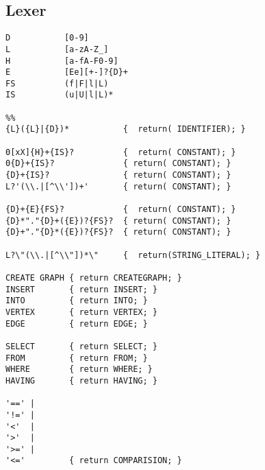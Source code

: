 \documentclass{article}
\begin{document}
\subsection{Lexer}
\begin{lstlisting}
D           [0-9]
L           [a-zA-Z_]
H           [a-fA-F0-9]
E           [Ee][+-]?{D}+
FS          (f|F|l|L)
IS          (u|U|l|L)*

%%
{L}({L}|{D})*           {  return( IDENTIFIER); }

0[xX]{H}+{IS}?          {  return( CONSTANT); }
0{D}+{IS}?              { return( CONSTANT); }
{D}+{IS}?               { return( CONSTANT); }
L?'(\\.|[^\\'])+'       { return( CONSTANT); }

{D}+{E}{FS}?            {  return( CONSTANT); }
{D}*"."{D}+({E})?{FS}?  { return( CONSTANT); }
{D}+"."{D}*({E})?{FS}?  { return( CONSTANT); }

L?\"(\\.|[^\\"])*\"     {  return(STRING_LITERAL); }

CREATE GRAPH { return CREATEGRAPH; }
INSERT       { return INSERT; }
INTO         { return INTO; }
VERTEX       { return VERTEX; }
EDGE         { return EDGE; }

SELECT       { return SELECT; }
FROM         { return FROM; }
WHERE        { return WHERE; }
HAVING       { return HAVING; }

'==' |
'!=' |
'<'  |
'>'  |
'>=' |
'<='         { return COMPARISION; }
\end{lstlisting}

\pagebreak
\end{document}
